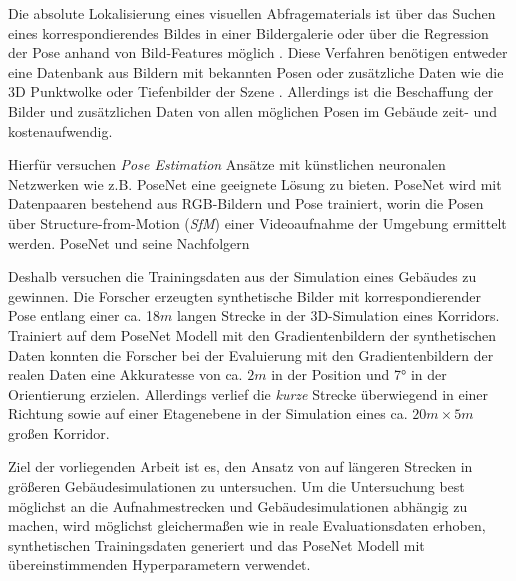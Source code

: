 Die absolute Lokalisierung eines visuellen Abfragematerials ist über das Suchen eines korrespondierendes Bildes in einer Bildergalerie oder über die Regression der Pose anhand von Bild-Features möglich \cite{piascoSurveyVisualBasedLocalization2018}. Diese Verfahren benötigen entweder eine Datenbank aus Bildern mit bekannten Posen \cite{zhangImageBasedLocalization2006, arandjelovicThreeThingsEveryone2012, radenovicCNNImageRetrieval2016} oder zusätzliche Daten wie die 3D Punktwolke \cite{irscharaStructurefrommotionPointClouds2009, liWorldwidePoseEstimation2012, svarmCityScaleLocalizationCameras2017} oder Tiefenbilder der Szene \cite{shottonSceneCoordinateRegression2013a}. Allerdings ist die Beschaffung der Bilder und zusätzlichen Daten von allen möglichen Posen im Gebäude zeit- und kostenaufwendig.


Hierfür versuchen \textit{Pose Estimation} Ansätze mit künstlichen neuronalen Netzwerken wie z.B. PoseNet \cite{kendallPoseNetConvolutionalNetwork2015} eine geeignete Lösung zu bieten. PoseNet wird mit Datenpaaren bestehend aus RGB-Bildern und Pose trainiert, worin die Posen über Structure-from-Motion (\textit{SfM}) einer Videoaufnahme der Umgebung ermittelt werden. PoseNet und seine Nachfolgern \cite{kendallModellingUncertaintyDeep2015a, walchImagebasedLocalizationUsing2016,  kendallGeometricLossFunctions2017,  clarkVidLocDeepSpatioTemporal2017}

Deshalb versuchen \citet{acharyaBIMPoseNetIndoorCamera2019} die Trainingsdaten aus der Simulation eines Gebäudes zu gewinnen. Die Forscher erzeugten synthetische Bilder mit korrespondierender Pose entlang einer ca. 18$m$ langen Strecke in der 3D-Simulation eines Korridors. Trainiert auf dem PoseNet Modell mit den Gradientenbildern der synthetischen Daten konnten die Forscher \citet{acharyaBIMPoseNetIndoorCamera2019} bei der Evaluierung mit den Gradientenbildern der realen Daten eine Akkuratesse von ca. $2m$ in der Position und 7° in der Orientierung erzielen. Allerdings verlief die \textit{kurze} Strecke überwiegend in einer Richtung sowie auf einer Etagenebene in der Simulation eines ca. $20m \times 5m$ großen Korridor.

Ziel der vorliegenden Arbeit ist es, den Ansatz von \citet{acharyaBIMPoseNetIndoorCamera2019} auf längeren Strecken in größeren Gebäudesimulationen zu untersuchen. Um die Untersuchung best möglichst an die Aufnahmestrecken und Gebäudesimulationen abhängig zu machen, wird möglichst gleichermaßen wie in \cite{acharyaBIMPoseNetIndoorCamera2019} reale Evaluationsdaten erhoben, synthetischen Trainingsdaten generiert und das PoseNet Modell mit übereinstimmenden Hyperparametern verwendet.


